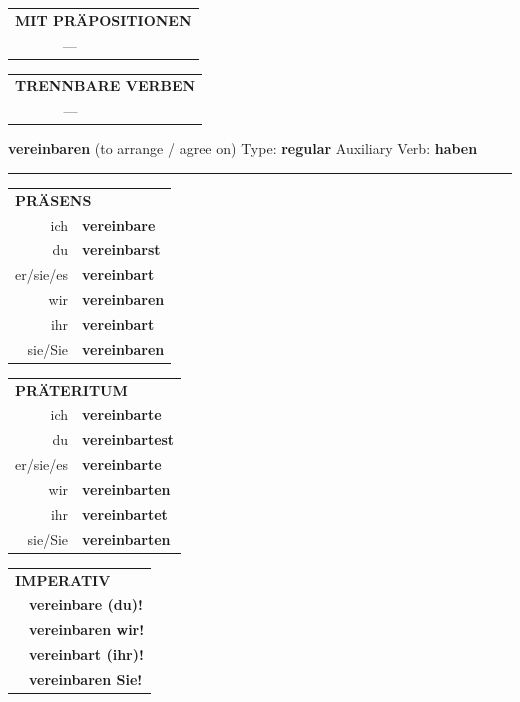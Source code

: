 \documentclass[10pt,a4paper]{revtex4-2}
\begin{document}
\begin{verbbox-acc}
\vspace{10pt}

\begin{tabular}{lll}
\multicolumn{3}{l}{\textbf{MIT PRÄPOSITIONEN}}\\
& ---\\
\end{tabular}
\hfill
\begin{tabular}{lll}
\multicolumn{3}{l}{\textbf{TRENNBARE VERBEN}}\\
& ---\\
\end{tabular}

\vspace{-5pt}
\end{verbbox-acc}

\begin{verbbox}
{\Large \bf vereinbaren} (to arrange / agree on) \hfill Type: \textbf{regular} \hfill Auxiliary Verb: \textbf{haben}

\vspace{5pt}
\hrule
\vspace{5pt}

\begin{tabular}{rl}
\multicolumn{2}{l}{\textbf{PRÄSENS}}\\
ich & \textbf{vereinbare}\\
du & \textbf{vereinbarst}\\
er/sie/es & \textbf{vereinbart}\\
wir & \textbf{vereinbaren}\\
ihr & \textbf{vereinbart}\\
sie/Sie & \textbf{vereinbaren}\\
\end{tabular}
\hfill
\begin{tabular}{rl}
\multicolumn{2}{l}{\textbf{PRÄTERITUM}}\\
ich & \textbf{vereinbarte}\\
du & \textbf{vereinbartest}\\
er/sie/es & \textbf{vereinbarte}\\
wir & \textbf{vereinbarten}\\
ihr & \textbf{vereinbartet}\\
sie/Sie & \textbf{vereinbarten}\\
\end{tabular}
\hfill
\begin{tabular}{rl}
\multicolumn{2}{l}{\textbf{IMPERATIV}}\\
& \textbf{vereinbare (du)!}\\
& \textbf{vereinbaren wir!}\\
& \textbf{vereinbart (ihr)!}\\
& \textbf{vereinbaren Sie!}\\
\end{tabular}


\end{verbbox}
\end{document}
